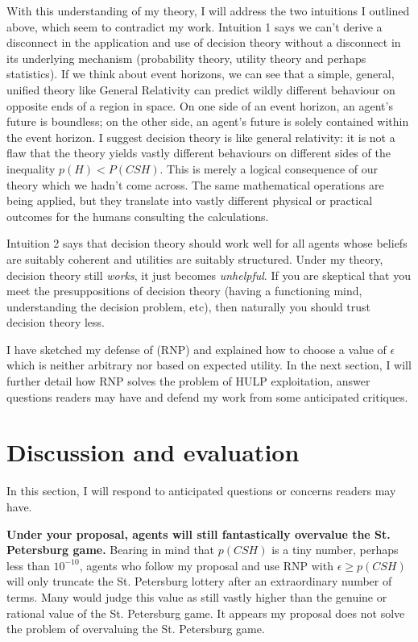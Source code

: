 \documentclass{article}
\begin{document}
With this understanding of my theory, I will address the two intuitions I outlined above, which seem to contradict my work. Intuition 1 says we can't derive a disconnect in the application and use of decision theory without a disconnect in its underlying mechanism (probability theory, utility theory and perhaps statistics). If we think about event horizons, we can see that a simple, general, unified theory like General Relativity can predict wildly different behaviour on opposite ends of a region in space. On one side of an event horizon, an agent's future is boundless; on the other side, an agent's future is solely contained within the event horizon. I suggest decision theory is like general relativity: it is not a flaw that the theory yields vastly different behaviours on different sides of the inequality \(p(H)<P(CSH)\). This is merely a logical consequence of our theory which we hadn't come across. The same mathematical operations are being applied, but they translate into vastly different physical or practical outcomes for the humans consulting the calculations.

Intuition 2 says that decision theory should work well for all agents whose beliefs are suitably coherent and utilities are suitably structured. Under my theory, decision theory still \textit{works}, it just becomes \textit{unhelpful}. If you are skeptical that you meet the presuppositions of decision theory (having a functioning mind, understanding the decision problem, etc), then naturally you should trust decision theory less.

I have sketched my defense of (RNP) and explained how to choose a value of \(\epsilon\) which is neither arbitrary nor based on expected utility. In the next section, I will further detail how RNP solves the problem of HULP exploitation, answer questions readers may have and defend my work from some anticipated critiques. 

\section{Discussion and evaluation}

In this section, I will respond to anticipated questions or concerns readers may have. 

\textbf{Under your proposal, agents will still fantastically overvalue the St. Petersburg game.} Bearing in mind that \(p(CSH)\) is a tiny number, perhaps less than \(10^{-10}\), agents who follow my proposal and use RNP with \(\epsilon \geq p(CSH)\) will only truncate the St. Petersburg lottery after an extraordinary number of terms. Many would judge this value as still vastly higher than the genuine or rational value of the St. Petersburg game. It appears my proposal does not solve the problem of overvaluing the St. Petersburg game. 
\end{document}
